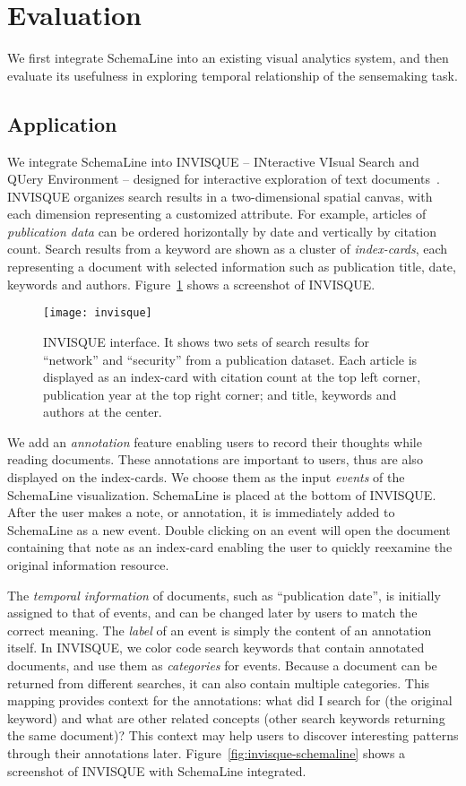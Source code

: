 \section{Evaluation}
We first integrate SchemaLine into an existing visual analytics system, and then evaluate its usefulness in exploring temporal relationship of the sensemaking task.

\subsection{Application}
We integrate SchemaLine into INVISQUE -- INteractive VIsual Search and QUery Environment -- designed for interactive exploration of text documents~\cite{Wong2011}. INVISQUE organizes search results in a two-dimensional spatial canvas, with each dimension representing a customized attribute. For example, articles of \emph{publication data} can be ordered horizontally by date and vertically by citation count. Search results from a keyword are shown as a cluster of \emph{index-cards}, each representing a document with selected information such as publication title, date, keywords and authors. Figure~\ref{fig:invisque} shows a screenshot of INVISQUE.

\begin{figure}[!htb]
	\centering
	\texttt{[image: invisque]}
	\caption{INVISQUE interface. It shows two sets of search results for ``network'' and ``security'' from a publication dataset. Each article is displayed as an index-card with citation count at the top left corner, publication year at the top right corner; and title, keywords and authors at the center.}
	\label{fig:invisque}
\end{figure}

We add an \emph{annotation} feature enabling users to record their thoughts while reading documents. These annotations are important to users, thus are also displayed on the index-cards. We choose them as the input \emph{events} of the SchemaLine visualization. SchemaLine is placed at the bottom of INVISQUE.
After the user makes a note, or annotation, it is immediately added to SchemaLine as a new event. Double clicking on an event will open the document containing that note as an index-card enabling the user to quickly reexamine the original information resource.

The \emph{temporal information} of documents, such as ``publication date'', is initially assigned to that of events, and can be changed later by users to match the correct meaning. The \emph{label} of an event is simply the content of an annotation itself. In INVISQUE, we color code search keywords that contain annotated documents, and use them as \emph{categories} for events. Because a document can be returned from different searches, it can also contain multiple categories. This mapping provides context for the annotations: what did I search for (the original keyword) and what are other related concepts (other search keywords returning the same document)? This context may help users to discover interesting patterns through their annotations later. Figure~\ref{fig:invisque-schemaline} shows a screenshot of INVISQUE with SchemaLine integrated.

